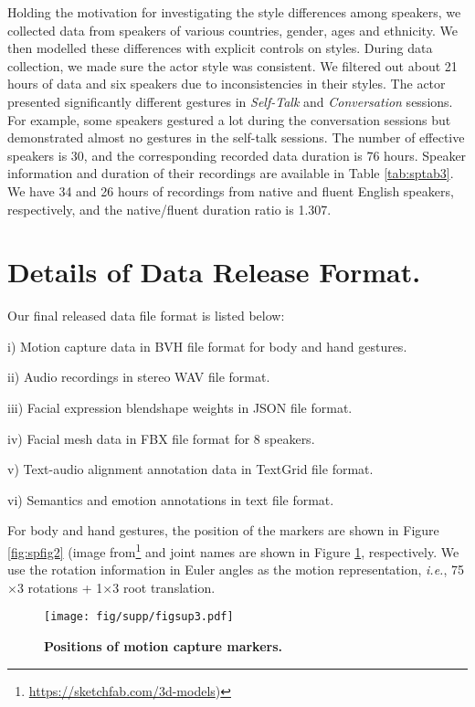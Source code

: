 \documentclass[runningheads]{llncs}
\begin{document}
Holding the motivation for investigating the style differences among speakers, we collected data from speakers of various countries, gender, ages and ethnicity. We then modelled these differences with explicit controls on styles. During data collection, we made sure the actor style was consistent. We filtered out about 21 hours of data and six speakers due to inconsistencies in their styles. The actor presented significantly different gestures in \textit{Self-Talk} and \textit{Conversation} sessions. For example, some speakers gestured a lot during the conversation sessions but demonstrated almost no gestures in the self-talk sessions. The number of effective speakers is 30, and the corresponding recorded data duration is 76 hours. Speaker information and duration of their recordings are available in Table \ref{tab:sptab3}. We have 34 and 26 hours of recordings from native and fluent English speakers, respectively, and the native/fluent duration ratio is 1.307.


\section{Details of Data Release Format.}
Our final released data file format is listed below:

i) Motion capture data in BVH file format for body and hand gestures.

ii) Audio recordings in stereo WAV file format.

iii) Facial expression blendshape weights in JSON file format.

iv) Facial mesh data in FBX file format for 8 speakers.

v) Text-audio alignment annotation data in TextGrid file format.

vi) Semantics and emotion annotations in text file format.


For body and hand gestures, the position of the markers are shown in Figure \ref{fig:spfig2} (image from\footnote{\url{https://sketchfab.com/3d-models})} and joint names are shown in Figure \ref{fig:spfig3}, respectively. We use the rotation information in Euler angles as the motion representation, \textit{i.e.}, 75$\times$3 rotations + 1$\times$3 root  translation. 

\begin{figure}
    \centering
    \texttt{[image: fig/supp/figsup3.pdf]}
    \caption{\textbf{Positions of motion capture markers.}}
    \label{fig:spfig3}
\end{figure}
\end{document}
